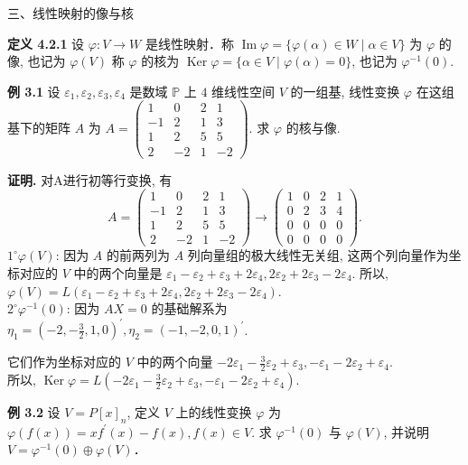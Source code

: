 \documentclass[14pt]{beamer}
\begin{document}
\begin{frame}{}
	
	三、线性映射的像与核
	
	\textbf{定义 4.2.1} 设  $\varphi: V \rightarrow W$  是线性映射．称 $\operatorname{Im} \varphi=\{\varphi(\alpha) \in W \mid \alpha \in V\}$ 为  $\varphi$  的像, 也记为  $\varphi(V)$ 称  $\varphi$  的核为  $\operatorname{Ker} \varphi=\{\alpha \in V \mid \varphi(\alpha)=0\}$, 也记为  $\varphi^{-1}(0)$.
	
	\textbf{例 3.1} 设  $\varepsilon_{1}, \varepsilon_{2}, \varepsilon_{3}, \varepsilon_{4}$  是数域  $\mathbb{P}$   上 $4$ 维线性空间  $V$  的一组基, 线性变换  $\varphi$  在这组基下的矩阵  $A$ 为 $A=\left(\begin{array}{cccc}1 & 0 & 2 & 1 \\-1 & 2 & 1 & 3 \\1 & 2 & 5 & 5 \\2 & -2 & 1 & -2\end{array}\right)$. 求  $\varphi$  的核与像.
\end{frame}

\begin{frame}{}
	\textbf{证明.} 对A进行初等行变换, 有 $$A=\begin{pmatrix}  1 & 0 & 2 & 1 \\-1 & 2 & 1 & 3 \\1 & 2 & 5 & 5 \\2 & -2 & 1 & -2\end{pmatrix} \rightarrow \begin{pmatrix} 1 & 0 & 2 & 1 \\0 & 2 & 3 & 4 \\0 & 0 & 0 & 0 \\0 & 0 & 0 & 0\end{pmatrix}.$$ 
	$1^{\circ} \varphi(V)$: 因为 $A$  的前两列为  $A$  列向量组的极大线性无关组, 这两个列向量作为坐标对应的 $V$ 中的两个向量是  $\varepsilon_{1}-\varepsilon_{2}+\varepsilon_{3}+2 \varepsilon_{4}, 2 \varepsilon_{2}+2 \varepsilon_{3}-2 \varepsilon_{4}$. 所以, $\varphi(V)=L\left(\varepsilon_{1}-\varepsilon_{2}+\varepsilon_{3}+2 \varepsilon_{4}, 2 \varepsilon_{2}+2 \varepsilon_{3}-2 \varepsilon_{4}\right)$.\\
	$2^{\circ} \varphi^{-1}(0)$: 因为 $AX=0$  的基础解系为  $\eta_{1}=\left(-2,-\frac{3}{2},1,0\right)^{\prime}, \eta_{2}=(-1,-2,0,1)^{\prime}$.
\end{frame}

\begin{frame}{}
	它们作为坐标对应的 $V$ 中的两个向量  $-2 \varepsilon_{1}-\frac{3}{2} \varepsilon_{2}+\varepsilon_{3},-\varepsilon_{1}-2 \varepsilon_{2}+\varepsilon_{4}$.\\ 所以, $\operatorname{Ker} \varphi=L\left(-2 \varepsilon_{1}-\frac{3}{2} \varepsilon_{2}+\varepsilon_{3},-\varepsilon_{1}-2 \varepsilon_{2}+\varepsilon_{4}\right)$.
	
	\textbf{例 3.2} 设  $V=P[x]_{n}$, 定义  $V$  上的线性变换  $\varphi$  为 $\varphi(f(x))=x f^{\prime}(x)-f(x), f(x) \in V$. 求  $\varphi^{-1}(0)$  与  $\varphi(V)$, 并说明  $V=\varphi^{-1}(0) \oplus \varphi(V)$．
\end{frame}
\end{document}
